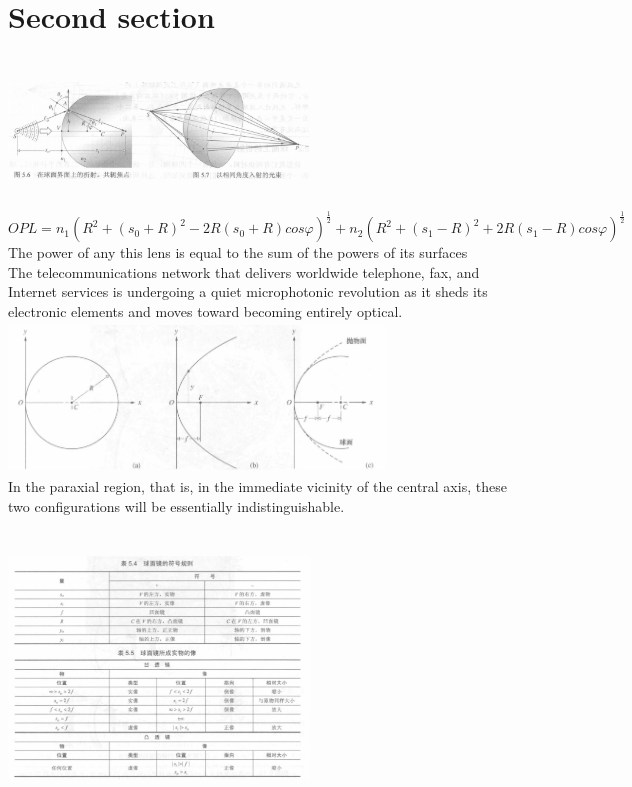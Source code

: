 \documentclass[fleqn,leqno]{article}
\begin{document}
	\section{Second section}
	\mathindent=0mm
		\includegraphics[width=8cm,height=4cm]{refraction.png}
		\begin{equation*}
			OPL=n_{1}(R^{2}+(s_{0}+R)^{2}-2R(s_{0}+R)cos\varphi)^{\frac{1}{2}}+n_{2}(R^{2}+(s_{1}-R)^{2}+2R(s_{1}-R)cos\varphi)^{\frac{1}{2}}
		\end{equation*}
		The power of any this lens is equal to the sum of the powers of its surfaces\\
		The telecommunications network that delivers worldwide telephone, fax, and Internet services is undergoing a quiet microphotonic revolution as it sheds its electronic elements and moves toward becoming entirely optical.\\
		\includegraphics[width=10cm,height=4cm]{image1.png}\\
		In the paraxial region, that is, in the immediate vicinity of the central axis, these two configurations will be essentially indistinguishable.\\
		\includegraphics[width=8cm,height=8cm]{rule.png}\\
\end{document}

